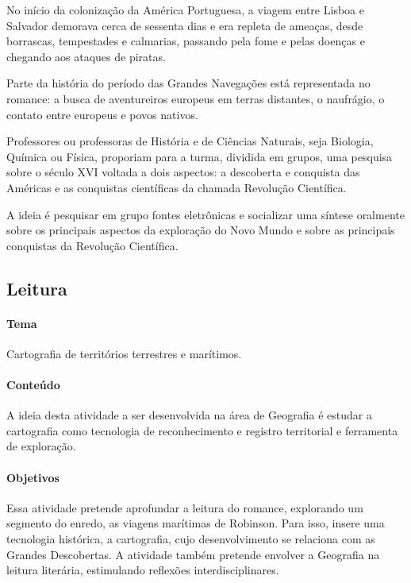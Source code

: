 \documentclass[12pt]{extarticle}
\begin{document}
No início da colonização da América Portuguesa, a viagem entre Lisboa e
Salvador demorava cerca de sessenta dias e era repleta de ameaças, desde
borrascas, tempestades e calmarias, passando pela fome e pelas doenças e
chegando aos ataques de piratas.

Parte da história do período das Grandes Navegações está representada no
romance: a busca de aventureiros europeus em terras distantes, o
naufrágio, o contato entre europeus e povos nativos.

Professores ou professoras de História e de Ciências Naturais, seja
Biologia, Química ou Física, proporiam para a turma, dividida em grupos,
uma pesquisa sobre o século XVI voltada a dois aspectos: a descoberta e
conquista das Américas e as conquistas científicas da chamada Revolução
Científica.

A ideia é pesquisar em grupo fontes eletrônicas e socializar uma síntese
oralmente sobre os principais aspectos da exploração do Novo Mundo e
sobre as principais conquistas da Revolução Científica.



\subsection{Leitura}

\paragraph{Tema} Cartografia de territórios terrestres e marítimos.


\paragraph{Conteúdo}
A ideia desta atividade a ser desenvolvida na área de Geografia é
estudar a cartografia como tecnologia de reconhecimento e registro
territorial e ferramenta de exploração.

\paragraph{Objetivos}

Essa atividade pretende aprofundar a leitura do romance, explorando um
segmento do enredo, as viagens marítimas de Robinson. Para isso, insere
uma tecnologia histórica, a cartografia, cujo desenvolvimento se
relaciona com as Grandes Descobertas. A atividade também pretende
envolver a Geografia na leitura literária, estimulando reflexões
interdisciplinares.
\end{document}
